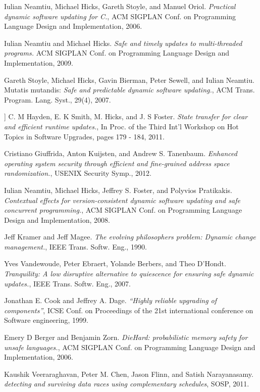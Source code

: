 \documentclass[a4paper,11pt,twoside]{article}
\begin{document}
\begin{thebibliography}{1}
   Iulian Neamtiu, Michael Hicks, Gareth Stoyle, and Manuel Oriol. {\em Practical dynamic software updating for C.}, ACM SIGPLAN Conf. on Programming Language Design and Implementation, 2006.

   Iulian Neamtiu and Michael Hicks. {\em Safe and timely updates to multi-threaded programs.} ACM SIGPLAN Conf. on Programming Language Design and Implementation,  2009.

   Gareth Stoyle, Michael Hicks, Gavin Bierman, Peter Sewell, and Iulian Neamtiu. Mutatis mutandis: {\em Safe and predictable dynamic software updating.}, ACM Trans. Program. Lang. Syst., 29(4), 2007.
  
   ] C. M Hayden, E. K Smith, M. Hicks, and J. S Foster. {\em State transfer for clear and efficient runtime updates.}, In Proc. of the Third Int’l Workshop on Hot Topics in Software Upgrades, pages 179 - 184, 2011.

   Cristiano Giuffrida, Anton Kuijsten, and Andrew S. Tanenbaum. {\em Enhanced operating system security through efficient and fine-grained address space randomization.}, USENIX Security Symp., 2012.

   Iulian Neamtiu, Michael Hicks, Jeffrey S. Foster, and Polyvios Pratikakis. {\em Contextual effects for version-consistent dynamic software updating and safe concurrent programming.}, ACM SIGPLAN Conf. on Programming Language Design and Implementation, 2008. 

   Jeff Kramer and Jeff Magee. {\em The evolving philosophers problem: Dynamic change management.}, IEEE Trans. Softw. Eng., 1990. 

  Yves Vandewoude, Peter Ebraert, Yolande Berbers, and Theo D’Hondt. {\em Tranquility: A low disruptive alternative to quiescence for ensuring safe dynamic updates.}, IEEE Trans. Softw. Eng., 2007.

  Jonathan E. Cook and	Jeffrey A. Dage. {\em “Highly reliable upgrading of components”}, ICSE Conf. on Proceedings of the 21st international conference on Software engineering, 1999.

  Emery D Berger and Benjamin Zorn. {\em DieHard: probabilistic memory safety for unsafe languages.}, ACM SIGPLAN Conf. on Programming Language Design and Implementation, 2006.
 
  Kaushik Veeraraghavan, Peter M. Chen, Jason Flinn, and Satish Narayanasamy. {\em detecting and surviving data races using complementary schedules}, SOSP, 2011. 
 

\end{thebibliography}
\end{document}
